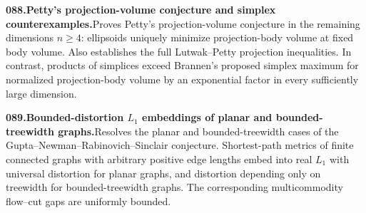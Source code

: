 \documentclass[11pt,a4paper]{article}
\begin{document}
  \par \begin{minipage}{\linewidth}
  \fontsize{10.5}{12.6}\selectfont\RaggedRight
  \hypertarget{result 088}{}
  {\bfseries\textcolor{muted}{088.}\enspace Petty's projection-volume conjecture and simplex counterexamples.}\enspace Proves Petty's projection-volume conjecture in the remaining dimensions $n\ge4$: ellipsoids uniquely minimize projection-body volume at fixed body volume. Also establishes the full Lutwak--Petty projection inequalities. In contrast, products of simplices exceed Brannen's proposed simplex maximum for normalized projection-body volume by an exponential factor in every sufficiently large dimension.\par
  \end{minipage}\par\vspace{5pt}



  \par \begin{minipage}{\linewidth}
  \fontsize{10.5}{12.6}\selectfont\RaggedRight
  \hypertarget{result 089}{}
  {\bfseries\textcolor{muted}{089.}\enspace Bounded-distortion $L_1$ embeddings of planar and bounded-treewidth graphs.}\enspace Resolves the planar and bounded-treewidth cases of the Gupta--Newman--Rabinovich--Sinclair conjecture. Shortest-path metrics of finite connected graphs with arbitrary positive edge lengths embed into real $L_1$ with universal distortion for planar graphs, and distortion depending only on treewidth for bounded-treewidth graphs. The corresponding multicommodity flow--cut gaps are uniformly bounded.\par
  \end{minipage}\par\vspace{5pt}
\end{document}
